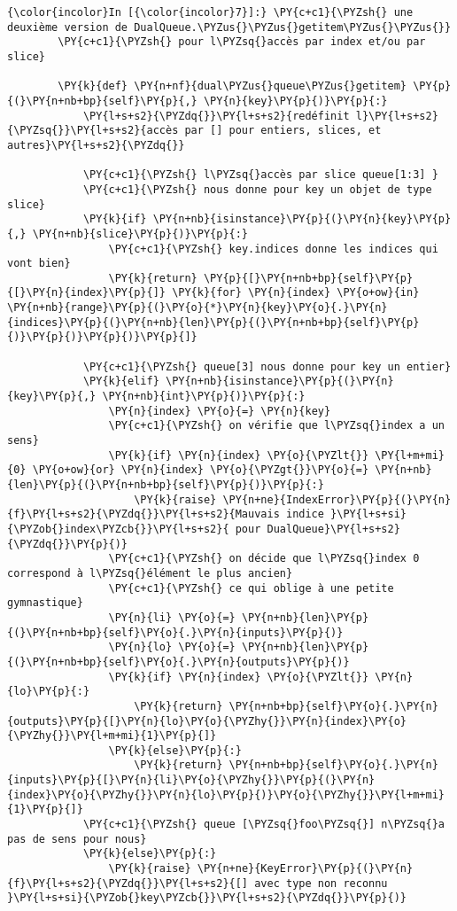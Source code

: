     \begin{Verbatim}[commandchars=\\\{\}]
{\color{incolor}In [{\color{incolor}7}]:} \PY{c+c1}{\PYZsh{} une deuxième version de DualQueue.\PYZus{}\PYZus{}getitem\PYZus{}\PYZus{}}
        \PY{c+c1}{\PYZsh{} pour l\PYZsq{}accès par index et/ou par slice}
        
        \PY{k}{def} \PY{n+nf}{dual\PYZus{}queue\PYZus{}getitem} \PY{p}{(}\PY{n+nb+bp}{self}\PY{p}{,} \PY{n}{key}\PY{p}{)}\PY{p}{:}
            \PY{l+s+s2}{\PYZdq{}}\PY{l+s+s2}{redéfinit l}\PY{l+s+s2}{\PYZsq{}}\PY{l+s+s2}{accès par [] pour entiers, slices, et autres}\PY{l+s+s2}{\PYZdq{}}
        
            \PY{c+c1}{\PYZsh{} l\PYZsq{}accès par slice queue[1:3] }
            \PY{c+c1}{\PYZsh{} nous donne pour key un objet de type slice}
            \PY{k}{if} \PY{n+nb}{isinstance}\PY{p}{(}\PY{n}{key}\PY{p}{,} \PY{n+nb}{slice}\PY{p}{)}\PY{p}{:}
                \PY{c+c1}{\PYZsh{} key.indices donne les indices qui vont bien}
                \PY{k}{return} \PY{p}{[}\PY{n+nb+bp}{self}\PY{p}{[}\PY{n}{index}\PY{p}{]} \PY{k}{for} \PY{n}{index} \PY{o+ow}{in} \PY{n+nb}{range}\PY{p}{(}\PY{o}{*}\PY{n}{key}\PY{o}{.}\PY{n}{indices}\PY{p}{(}\PY{n+nb}{len}\PY{p}{(}\PY{n+nb+bp}{self}\PY{p}{)}\PY{p}{)}\PY{p}{)}\PY{p}{]}
        
            \PY{c+c1}{\PYZsh{} queue[3] nous donne pour key un entier}
            \PY{k}{elif} \PY{n+nb}{isinstance}\PY{p}{(}\PY{n}{key}\PY{p}{,} \PY{n+nb}{int}\PY{p}{)}\PY{p}{:}
                \PY{n}{index} \PY{o}{=} \PY{n}{key}
                \PY{c+c1}{\PYZsh{} on vérifie que l\PYZsq{}index a un sens}
                \PY{k}{if} \PY{n}{index} \PY{o}{\PYZlt{}} \PY{l+m+mi}{0} \PY{o+ow}{or} \PY{n}{index} \PY{o}{\PYZgt{}}\PY{o}{=} \PY{n+nb}{len}\PY{p}{(}\PY{n+nb+bp}{self}\PY{p}{)}\PY{p}{:}
                    \PY{k}{raise} \PY{n+ne}{IndexError}\PY{p}{(}\PY{n}{f}\PY{l+s+s2}{\PYZdq{}}\PY{l+s+s2}{Mauvais indice }\PY{l+s+si}{\PYZob{}index\PYZcb{}}\PY{l+s+s2}{ pour DualQueue}\PY{l+s+s2}{\PYZdq{}}\PY{p}{)}
                \PY{c+c1}{\PYZsh{} on décide que l\PYZsq{}index 0 correspond à l\PYZsq{}élément le plus ancien}
                \PY{c+c1}{\PYZsh{} ce qui oblige à une petite gymnastique}
                \PY{n}{li} \PY{o}{=} \PY{n+nb}{len}\PY{p}{(}\PY{n+nb+bp}{self}\PY{o}{.}\PY{n}{inputs}\PY{p}{)}
                \PY{n}{lo} \PY{o}{=} \PY{n+nb}{len}\PY{p}{(}\PY{n+nb+bp}{self}\PY{o}{.}\PY{n}{outputs}\PY{p}{)}
                \PY{k}{if} \PY{n}{index} \PY{o}{\PYZlt{}} \PY{n}{lo}\PY{p}{:}
                    \PY{k}{return} \PY{n+nb+bp}{self}\PY{o}{.}\PY{n}{outputs}\PY{p}{[}\PY{n}{lo}\PY{o}{\PYZhy{}}\PY{n}{index}\PY{o}{\PYZhy{}}\PY{l+m+mi}{1}\PY{p}{]}
                \PY{k}{else}\PY{p}{:}
                    \PY{k}{return} \PY{n+nb+bp}{self}\PY{o}{.}\PY{n}{inputs}\PY{p}{[}\PY{n}{li}\PY{o}{\PYZhy{}}\PY{p}{(}\PY{n}{index}\PY{o}{\PYZhy{}}\PY{n}{lo}\PY{p}{)}\PY{o}{\PYZhy{}}\PY{l+m+mi}{1}\PY{p}{]}
            \PY{c+c1}{\PYZsh{} queue [\PYZsq{}foo\PYZsq{}] n\PYZsq{}a pas de sens pour nous}
            \PY{k}{else}\PY{p}{:}
                \PY{k}{raise} \PY{n+ne}{KeyError}\PY{p}{(}\PY{n}{f}\PY{l+s+s2}{\PYZdq{}}\PY{l+s+s2}{[] avec type non reconnu }\PY{l+s+si}{\PYZob{}key\PYZcb{}}\PY{l+s+s2}{\PYZdq{}}\PY{p}{)}
        

\end{Verbatim}
